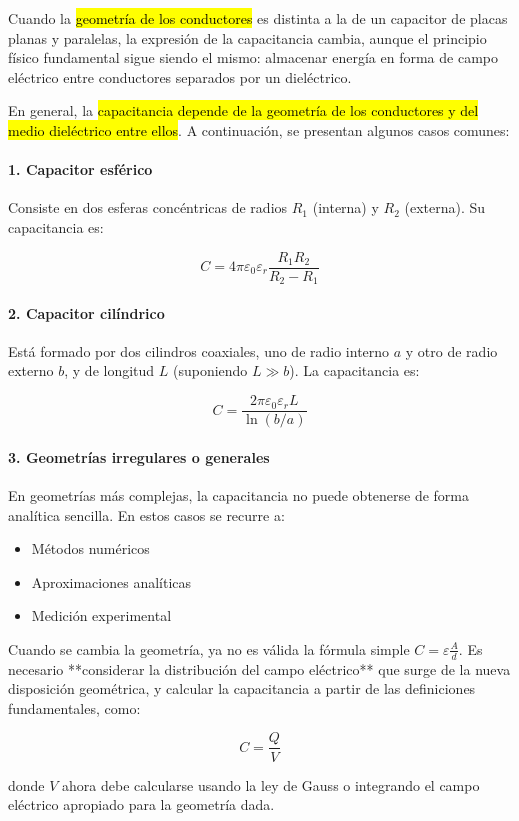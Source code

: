 Cuando la \hl{geometría de los conductores} es distinta a la de un capacitor de placas planas y paralelas, la expresión de la capacitancia cambia, aunque el principio físico fundamental sigue siendo el mismo: almacenar energía en forma de campo eléctrico entre conductores separados por un dieléctrico.

En general, la \hl{capacitancia depende de la geometría de los conductores y del medio dieléctrico entre ellos}. A continuación, se presentan algunos casos comunes:

\paragraph{1. Capacitor esférico}

Consiste en dos esferas concéntricas de radios \( R_1 \) (interna) y \( R_2 \) (externa). Su capacitancia es:

\[
C = 4\pi \varepsilon_0 \varepsilon_r \frac{R_1 R_2}{R_2 - R_1}
\]

\paragraph{2. Capacitor cilíndrico}

Está formado por dos cilindros coaxiales, uno de radio interno \( a \) y otro de radio externo \( b \), y de longitud \( L \) (suponiendo \( L \gg b \)). La capacitancia es:

\[
C = \frac{2\pi \varepsilon_0 \varepsilon_r L}{\ln(b/a)}
\]

\paragraph{3. Geometrías irregulares o generales}

En geometrías más complejas, la capacitancia no puede obtenerse de forma analítica sencilla. En estos casos se recurre a:

\begin{itemize}
    \item Métodos numéricos
    \item Aproximaciones analíticas
    \item Medición experimental
\end{itemize}

Cuando se cambia la geometría, ya no es válida la fórmula simple \( C = \varepsilon \frac{A}{d} \). Es necesario **considerar la distribución del campo eléctrico** que surge de la nueva disposición geométrica, y calcular la capacitancia a partir de las definiciones fundamentales, como:

\[
C = \frac{Q}{V}
\]

donde \( V \) ahora debe calcularse usando la ley de Gauss o integrando el campo eléctrico apropiado para la geometría dada.